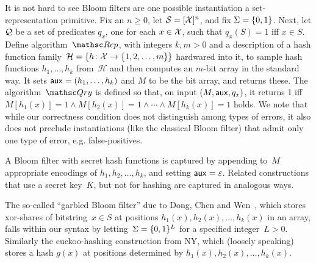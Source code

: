 It is not hard to see Bloom filters are one possible instantiation a set-representation primitive.
Fix an $n \geq 0$, let $\mathcal{S}=[{\cal X}]^n$, and fix $\Sigma=\{0,1\}$.  
Next, let ${\cal Q}$ be a set of predicates $q_x$, one for each $x \in {\cal X}$,
such that $q_x(S)=1$ iff $x \in S$.  Define algorithm~$\Rep$, with integers $k, m > 0$ and a description of a hash function family~$\mathcal{H}=\{h \colon {\cal X} \to \{1,2,\ldots,m\}\}$ hardwared into it, to sample hash functions $h_1, \ldots, h_k$ from~$\mathcal{H}$ and then computes an $m$-bit array in the standard way. It sets ${\sf aux} = (h_1, \ldots, h_k)$ and $M$ to be the bit array, and returns these.  The algorithm~$\Qry$ is defined so that, on input $(M,{\sf aux},q_x)$, it returns 1 iff $M[h_1(x)]=1 \wedge M[h_2(x)]=1 \wedge \cdots \wedge M[h_k(x)]=1$ holds.
We note that while our correctness condition does not distinguish among types of errors, it also does not preclude instantiations (like the classical Bloom filter) that admit only one type of error, e.g. false-positives.  

A Bloom filter with secret hash functions is captured by appending to~$M$ appropriate encodings of $h_1,h_2,\ldots,h_k$, and setting ${\sf aux}=\varepsilon$.  Related constructions that use a secret key~$K$, but not for hashing are captured in analogous ways.

The so-called ``garbled Bloom filter'' due to Dong, Chen and Wen~\cite{xxx}, which stores xor-shares of bitstring~$x \in S$ at positions $h_1(x),h_2(x),\ldots,h_k(x)$ in an array, falls within our syntax by letting~$\Sigma=\{0,1\}^L$ for a specified integer~$L>0$.  Similarly the cuckoo-hashing construction from NY, which (loosely speaking) stores a hash $g(x)$ at positions determined by $h_1(x),h_2(x),\ldots,h_k(x)$.   

